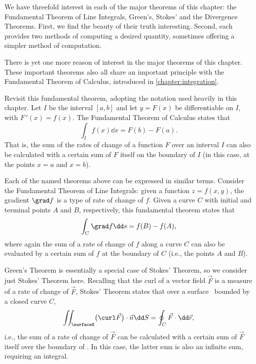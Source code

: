 We have threefold interest in each of the major theorems of this chapter: the Fundamental Theorem of Line Integrals, Green's, Stokes' and the Divergence Theorems. First, we find the beauty of their truth interesting. Second, each provides two methods of computing a desired quantity, sometimes offering a simpler method of computation. 


There is yet one more reason of interest in the major theorems of this chapter. %
These important theorems also all share an important principle with the Fundamental Theorem of Calculus, introduced in \autoref{chapter:integration}. 

Revisit this fundamental theorem, adopting the notation used heavily in this chapter. Let $I$ be the interval $[a,b]$ and let $y=F(x)$ be differentiable on $I$, with $F\,'(x) = f(x)$. The Fundamental Theorem of Calculus states that 
\[\int_I f(x)\dd x = F(b) - F(a).\]
That is, the sum of the rates of change of a function $F$ over an interval $I$ can also be calculated with a certain sum of $F$ itself on the boundary of $I$ (in this case, at the points $x=a$ and $x=b$).

Each of the named theorems above can be expressed in similar terms. Consider the Fundamental Theorem of Line Integrals: given a function $z=f(x,y)$, the gradient $\grad f$ is a type of rate of change of $f$. Given a curve $C$ with initial and terminal points $A$ and $B$, respectively, this fundamental theorem states that 
\[\int_C \grad f\dd s = f(B) - f(A),\]
where again the sum of a rate of change of $f$ along a curve $C$ can also be evaluated by a certain sum of $f$ at the boundary of $C$ (i.e., the points $A$ and $B$).

Green's Theorem is essentially a special case of Stokes' Theorem, so we consider just Stokes' Theorem here. Recalling that the curl of a vector field $\vec F$ is a measure of a rate of change of $\vec F$, Stokes' Theorem states that over a surface \surfaceS\ bounded by a closed curve $C$,
\[
\iint_\surfaceS \bigl(\curl \vec F\bigr)\cdot \vec n\dd S = \oint_C \vec F\cdot\dd\vec r,
\]
i.e., the sum of a rate of change of $\vec F$ can be calculated with a certain sum of $\vec F$ itself over the boundary of \surfaceS. In this case, the latter sum is also an infinite sum, requiring an integral. 

